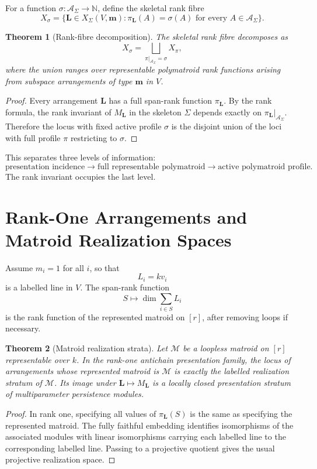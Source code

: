 \documentclass[11pt]{article}
\newtheorem{theorem}{Theorem}[section]
\begin{document}
For a function \(\sigma:\mathcal A_\Sigma\to\mathbb N\), define the skeletal rank fibre
\[
X_\sigma
=
\{\mathbf L\in X_\Sigma(V,\mathbf m):
\pi_{\mathbf L}(A)=\sigma(A)\text{ for every }A\in\mathcal A_\Sigma\}.
\]

\begin{theorem}[Rank-fibre decomposition]
The skeletal rank fibre decomposes as
\[
X_\sigma
=
\bigsqcup_{\pi\vert_{\mathcal A_\Sigma}=\sigma}
X_\pi,
\]
where the union ranges over representable polymatroid rank functions arising from subspace arrangements of type \(\mathbf m\) in \(V\).
\end{theorem}

\begin{proof}
Every arrangement \(\mathbf L\) has a full span-rank function \(\pi_{\mathbf L}\). By the rank formula, the rank invariant of \(M_{\mathbf L}\) in the skeleton \(\Sigma\) depends exactly on \(\pi_{\mathbf L}\vert_{\mathcal A_\Sigma}\). Therefore the locus with fixed active profile \(\sigma\) is the disjoint union of the loci with full profile \(\pi\) restricting to \(\sigma\).
\end{proof}

This separates three levels of information:
\[
\text{presentation incidence}
\longrightarrow
\text{full representable polymatroid}
\longrightarrow
\text{active polymatroid profile}.
\]
The rank invariant occupies the last level.

\section{Rank-One Arrangements and Matroid Realization Spaces}

Assume \(m_i=1\) for all \(i\), so that
\[
L_i=kv_i
\]
is a labelled line in \(V\). The span-rank function
\[
S\longmapsto \dim\sum_{i\in S}L_i
\]
is the rank function of the represented matroid on \([r]\), after removing loops if necessary.

\begin{theorem}[Matroid realization strata]
Let \(\mathcal M\) be a loopless matroid on \([r]\) representable over \(k\). In the rank-one antichain presentation family, the locus of arrangements whose represented matroid is \(\mathcal M\) is exactly the labelled realization stratum of \(\mathcal M\). Its image under \(\mathbf L\mapsto M_{\mathbf L}\) is a locally closed presentation stratum of multiparameter persistence modules.
\end{theorem}

\begin{proof}
In rank one, specifying all values of \(\pi_{\mathbf L}(S)\) is the same as specifying the represented matroid. The fully faithful embedding identifies isomorphisms of the associated modules with linear isomorphisms carrying each labelled line to the corresponding labelled line. Passing to a projective quotient gives the usual projective realization space.
\end{proof}
\end{document}
